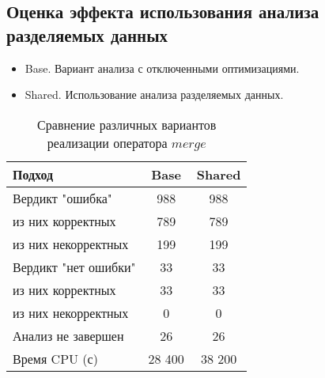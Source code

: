 %
%

\subsection{Оценка эффекта использования анализа разделяемых данных}

\begin{itemize}
\item Base. Вариант анализа с отключенными оптимизациями.
\item Shared. Использование анализа разделяемых данных.
\end{itemize}


\begin{center}
  \begin{table}[h]\footnotesize \centering
  	\label{table-drivers-lock-refinement}
    \caption{Сравнение различных вариантов реализации оператора $merge$}
    \begin{tabular}{ | l | c | c |}
      \hline
      Подход         				& Base 	& Shared 	\\ \hline
      Вердикт "ошибка" 				& 988   & 988    	\\ 
  \hspace{0.5cm} из них корректных 	& 789 	& 789 		\\ 
  \hspace{0.5cm} из них некорректных & 199 	& 199 		\\ \hline
      Вердикт "нет ошибки"  		& 33    & 33    	\\ 
  \hspace{0.5cm} из них корректных 	& 33 	& 33    	\\
  \hspace{0.5cm} из них некорректных & 0 	& 0    		\\ \hline
      Анализ не завершен       		& 26    & 26     	\\ \hline
      Время CPU (с)   				& 28 400 & 38 200  	\\ 
      \hline
    \end{tabular}
  \end{table}
\end{center}


